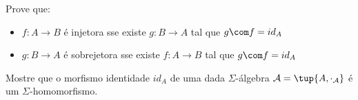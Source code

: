 \begin{exercise}
Prove que:
 \begin{itemize}
    \item $f : A \to B$ é injetora sse existe $ g : B \to A $ tal que $ g \com f = id_A $
    \item $g : B \to A$ é sobrejetora sse existe $ f : A \to B $ tal que $ g \com f = id_A $
 \end{itemize}
\end{exercise}

\begin{exercise}
Mostre que o morfismo identidade $id_A$ de uma dada $\Sigma$-álgebra $\mathcal{A} = \tup{A, \cdot_\mathcal{A} }$ é um $\Sigma$-homomorfismo.
\end{exercise}

